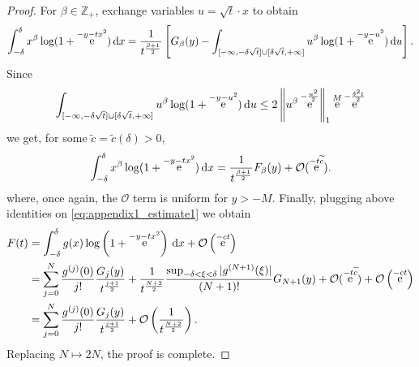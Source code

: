 \documentclass[10pt,a4paper]{amsart}
\DeclareMathOperator{\ee}{\rm e}
\newcommand{\Boh}{\mathcal{O}}
\newcommand{\Z}{\mathbb{Z}}
\newcommand{\dd}{\mathrm{d}}
\begin{document}
\begin{proof}
    For $\beta \in \Z_+$, exchange variables $u = \sqrt{t} \cdot x$ to obtain
    \[
        \int_{- \delta}^\delta x^\beta \log (1 + \ee^{- y - t x^2}) \, \dd x = \frac{1}{t^{\frac{\beta + 1}{2}}} \left[ G_\beta(y)  - 
        \int_{[-\infty, - \delta \sqrt{ t} ] \cup [\delta \sqrt{ t}, +\infty]} u^\beta \log ( 1 + \ee^{ - y - u^2}) \, \dd u \right].
    \]
    Since
    \[
        \int_{[-\infty, - \delta \sqrt{ t} ] \cup [\delta \sqrt{ t}, +\infty]} u^\beta \log ( 1 + \ee^{ - y - u^2}) \, \dd u 
        \leq 2 \left\| u^\beta \ee^{- \frac{u^2}{2}} \right\|_1 \ee^M \ee^{- \frac{\delta^2 t}{2}}
    \]
    we get, for some $\widetilde{c} = \widetilde{c}(\delta) > 0$,
    \[
        \int_{- \delta}^\delta x^\beta \log (1 + \ee^{- y - t x^2}) \, \dd x = \frac{1}{t^{\frac{\beta + 1}{2}}} F_\beta(y) + \Boh(\ee^{- t \widetilde{c}}).
    \]
    where, once again, the $\Boh$ term is uniform for $y > -M$. Finally, plugging above identities on \eqref{eq:appendix1_estimate1} we obtain
    \[
        \begin{split}
            F(t) 
                &= \int_{-\delta}^\delta g(x) \log\left(1 + \ee^{- y - t x^2} \right) \, \dd x +  \Boh \left( \ee^{- c t}\right) \\
                &= \sum_{j=0}^N \frac{g^{(j)}(0)}{j!}\frac{G_j(y)}{t^{\frac{j+1}{2}}}
                + \frac{1}{t^{\frac{N+2}{2}}} \frac{\sup_{-\delta < \xi < \delta}|g^{(N+1)}(\xi)|}{(N+1)!} G_{N+1}(y)
                + \Boh(\ee^{-t \widetilde{c}}) + \Boh \left( \ee^{- c t}\right) \\
                &= \sum_{j=0}^N \frac{g^{(j)}(0)}{j!} \frac{G_j(y)}{t^{\frac{j+1}{2}}}  + \Boh \left( \frac{1}{t^{\frac{N+2}{2}}} \right) .
        \end{split}
    \]
    Replacing $N\mapsto 2N$, the proof is complete.
\end{proof}
\end{document}
